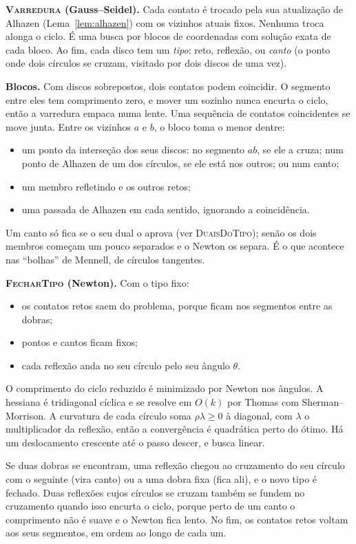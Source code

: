 \documentclass[11pt]{article}
\theoremstyle{plain}
\theoremstyle{remark}
\begin{document}
\textbf{\textsc{Varredura} (Gauss--Seidel).} Cada contato é trocado pela sua atualização de
Alhazen (Lema~\ref{lem:alhazen}) com os vizinhos atuais fixos. Nenhuma troca alonga o
ciclo. É uma busca por blocos de coordenadas com solução exata de cada bloco. Ao fim,
cada disco tem um \emph{tipo}: reto, reflexão, ou \emph{canto} (o ponto onde dois círculos
se cruzam, visitado por dois discos de uma vez).

\textbf{Blocos.} Com discos sobrepostos, dois contatos podem coincidir. O segmento entre
eles tem comprimento zero, e mover um sozinho nunca encurta o ciclo, então a varredura
empaca numa lente. Uma sequência de contatos coincidentes se move junta. Entre os vizinhos
$a$ e $b$, o bloco toma o menor dentre:
\begin{itemize}
  \item um ponto da interseção dos seus discos: no segmento $ab$, se ele a cruza; num ponto
    de Alhazen de um dos círculos, se ele está nos outros; ou num canto;
  \item um membro refletindo e os outros retos;
  \item uma passada de Alhazen em cada sentido, ignorando a coincidência.
\end{itemize}
Um canto só fica se o seu dual o aprova (ver \textsc{DuaisDoTipo}); senão os dois membros
começam um pouco separados e o Newton os separa. É o que acontece nas ``bolhas'' de
Mennell, de círculos tangentes.

\textbf{\textsc{FecharTipo} (Newton).} Com o tipo fixo:
\begin{itemize}
  \item os contatos retos saem do problema, porque ficam nos segmentos entre as dobras;
  \item pontos e cantos ficam fixos;
  \item cada reflexão anda no seu círculo pelo seu ângulo $\theta$.
\end{itemize}
O comprimento do ciclo reduzido é minimizado por Newton nos ângulos. A hessiana é
tridiagonal cíclica e se resolve em $O(k)$ por Thomas com Sherman--Morrison. A curvatura de
cada círculo soma $\rho\lambda\ge0$ à diagonal, com $\lambda$ o multiplicador da reflexão,
então a convergência é quadrática perto do ótimo. Há um deslocamento crescente até o passo
descer, e busca linear.

Se duas dobras se encontram, uma reflexão chegou ao cruzamento do seu círculo com o
seguinte (vira canto) ou a uma dobra fixa (fica ali), e o novo tipo é fechado. Duas
reflexões cujos círculos se cruzam também se fundem no cruzamento quando isso encurta o
ciclo, porque perto de um canto o comprimento não é suave e o Newton fica lento. No fim, os
contatos retos voltam aos seus segmentos, em ordem ao longo de cada um.
\end{document}
